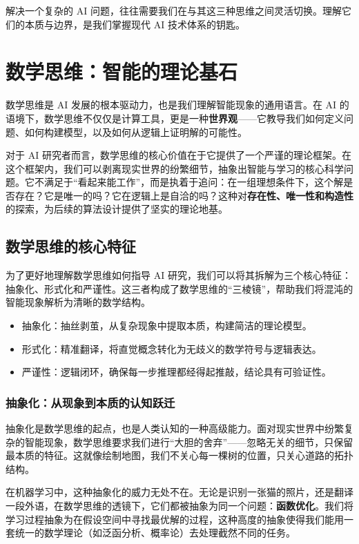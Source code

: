 解决一个复杂的 AI 问题，往往需要我们在与其这三种思维之间灵活切换。理解它们的本质与边界，是我们掌握现代 AI 技术体系的钥匙。

\section{数学思维：智能的理论基石}

数学思维是 AI 发展的根本驱动力，也是我们理解智能现象的通用语言。在 AI 的语境下，数学思维不仅仅是计算工具，更是一种\textbf{世界观}——它教导我们如何定义问题、如何构建模型，以及如何从逻辑上证明解的可能性。

对于 AI 研究者而言，数学思维的核心价值在于它提供了一个严谨的理论框架。在这个框架内，我们可以剥离现实世界的纷繁细节，抽象出智能与学习的核心科学问题。它不满足于“看起来能工作”，而是执着于追问：在一组理想条件下，这个解是否存在？它是唯一的吗？它在逻辑上是自洽的吗？这种对\textbf{存在性、唯一性和构造性}的探索，为后续的算法设计提供了坚实的理论地基。

\subsection{数学思维的核心特征}

为了更好地理解数学思维如何指导 AI 研究，我们可以将其拆解为三个核心特征：抽象化、形式化和严谨性。这三者构成了数学思维的“三棱镜”，帮助我们将混沌的智能现象解析为清晰的数学结构。

\begin{itemize}[核心概念：数学思维的三大特征] 
  \item{抽象化}：抽丝剥茧，从复杂现象中提取本质，构建简洁的理论模型。
  \item{形式化}：精准翻译，将直觉概念转化为无歧义的数学符号与逻辑表达。
  \item{严谨性}：逻辑闭环，确保每一步推理都经得起推敲，结论具有可验证性。 \end{itemize}

\subsubsection{抽象化：从现象到本质的认知跃迁}

抽象化是数学思维的起点，也是人类认知的一种高级能力。面对现实世界中纷繁复杂的智能现象，数学思维要求我们进行“大胆的舍弃”——忽略无关的细节，只保留最本质的特征。这就像绘制地图，我们不关心每一棵树的位置，只关心道路的拓扑结构。

在机器学习中，这种抽象化的威力无处不在。无论是识别一张猫的照片，还是翻译一段外语，在数学思维的透镜下，它们都被抽象为同一个问题：\textbf{函数优化}。我们将学习过程抽象为在假设空间中寻找最优解的过程，这种高度的抽象使得我们能用一套统一的数学理论（如泛函分析、概率论）去处理截然不同的任务。

